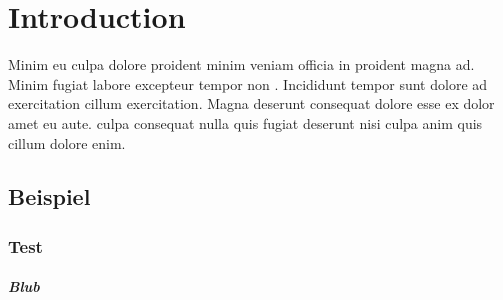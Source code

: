 \chapter{Introduction} \label{ch:introduction}
Minim eu culpa dolore proident minim veniam officia in proident magna ad. Minim fugiat labore excepteur tempor non \cite{test.2022}. Incididunt tempor sunt dolore ad exercitation cillum exercitation. Magna deserunt consequat dolore esse ex dolor amet eu aute. \textcite{test.2022} culpa consequat nulla quis fugiat deserunt nisi culpa anim quis cillum dolore enim.

\section{Beispiel} \label{sec:beispiel}

\subsection{Test} \label{subsec:test}

\paragraph{Blub} \label{par:blub}